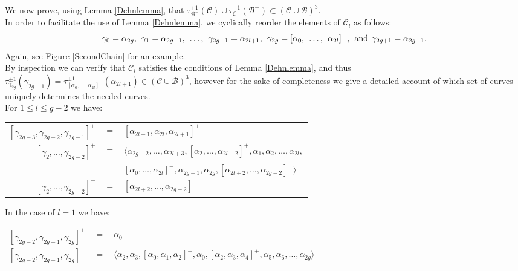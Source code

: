 \documentclass[twoside,11pt,a4paper]{article}
\newcommand*{\Cf}{\mathscr{C}}
\newcommand*{\Bf}{\mathscr{B}}
\begin{document}
\indent We now prove, using Lemma \ref{Dehnlemma}, that $\tau_{\Bf^{-}}^{\pm 1}(\Cf) \cup \tau_{\Cf}^{\pm 1}(\Bf^{-}) \subset (\Cf \cup \Bf)^{3}$.\\
\indent In order to facilitate the use of Lemma \ref{Dehnlemma}, we cyclically reorder the elements of $\Cf_{l}$ as follows: $$\gamma_{0} = \alpha_{2g}, \hspace{0.15cm} \gamma_{1} = \alpha_{2g-1}, \hspace{0.15cm} \ldots, \hspace{0.15cm} \gamma_{2g-1} = \alpha_{2l+1}, \hspace{0.15cm} \gamma_{2g} = [\alpha_{0}, \hspace{0.15cm} \ldots, \hspace{0.15cm} \alpha_{2l}]^{-}, \hspace{0.15cm} \mathrm{and} \hspace{0.15cm} \gamma_{2g+1} = \alpha_{2g+1}.$$ Again, see Figure \ref{SecondChain} for an example.\\
\indent By inspection we can verify that $\Cf_{l}$ satisfies the conditions of Lemma \ref{Dehnlemma}, and thus $\tau_{\gamma_{2g}}^{\pm 1}(\gamma_{2g-1}) = \tau_{[\alpha_{0}, \ldots, \alpha_{2l}]^{-}}^{\pm 1}(\alpha_{2l+1}) \in (\Cf \cup \Bf)^{3}$, however for the sake of completeness we give a detailed account of which set of curves uniquely determines the needed curves.\\
For $1 \leq l \leq g-2$ we have:
\begin{center}
\begin{tabular}{rcl}
 $[\gamma_{2g-3},\gamma_{2g-2},\gamma_{2g-1}]^{+}$ & $=$ & $[\alpha_{2l-1},\alpha_{2l},\alpha_{2l+1}]^{+}$\\
 $[\gamma_{2},\ldots,\gamma_{2g-2}]^{+}$ & $=$ & $\langle \alpha_{2g-2},\ldots,\alpha_{2l+3},[\alpha_{2}, \ldots, \alpha_{2l+2}]^{+}, \alpha_{1},\alpha_{2},\ldots,\alpha_{2l},$\\
 & & $[\alpha_{0},\ldots,\alpha_{2l}]^{-}, \alpha_{2g+1}, \alpha_{2g}, [\alpha_{2l+2}, \ldots, \alpha_{2g-2}]^{-}\rangle$\\
 $[\gamma_{2}, \ldots, \gamma_{2g-2}]^{-}$ & $=$ & $[\alpha_{2l+2}, \ldots, \alpha_{2g-2}]^{-}$
\end{tabular}
\end{center}
\indent In the case of $l = 1$ we have:
\begin{center}
\begin{tabular}{rcl}
 $[\gamma_{2g-2},\gamma_{2g-1},\gamma_{2g}]^{+}$ & $=$ & $\alpha_{0}$\\
 $[\gamma_{2g-2},\gamma_{2g-1},\gamma_{2g}]^{-}$ & $=$ & $\langle \alpha_{2},\alpha_{3},[\alpha_{0},\alpha_{1},\alpha_{2}]^{-},\alpha_{0},[\alpha_{2},\alpha_{3},\alpha_{4}]^{+},\alpha_{5},\alpha_{6}, \ldots, \alpha_{2g}\rangle$
\end{tabular}
\end{center}
\end{document}
